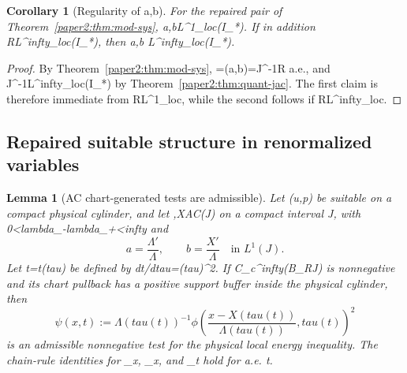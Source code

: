 \documentclass[11pt]{amsart}
\def\({}%
\def\){}%
\def\tau{tau}%
\def\lambda{lambda}%
\def\infty{infty}%
\theoremstyle{plain}
\newtheorem{lemma}[lemma]{Lemma}
\newtheorem{corollary}[corollary]{Corollary}
\theoremstyle{definition}
\theoremstyle{remark}
\begin{document}
\begin{corollary}[Regularity of \(a,b\)]
For the repaired pair of Theorem~\ref{paper2:thm:mod-sys}, \(a,b\in L^1_{\rm loc}(I_*)\).
If in addition \(\mathcal R\in L^\infty_{\rm loc}(I_*)\), then \(a,b\in
L^\infty_{\rm loc}(I_*)\).
\end{corollary}

\begin{proof}
By Theorem~\ref{paper2:thm:mod-sys}, \(\theta=(a,b)=J^{-1}\mathcal R\) a.e., and
\(J^{-1}\in L^\infty_{\rm loc}(I_*)\) by Theorem~\ref{paper2:thm:quant-jac}. The first claim is therefore
immediate from \(\mathcal R\in L^1_{\rm loc}\), while the second follows if \(\mathcal R\in L^\infty_{\rm loc}\).
\end{proof}

\subsection{Repaired suitable structure in renormalized variables}\label{paper2:sec:suitable}

\begin{lemma}[AC chart-generated tests are admissible]\label{paper2:lem:ac-chart-tests}
Let \((u,p)\) be suitable on a compact physical cylinder, and let
\(\Lambda,X\in AC(J)\) on a compact interval \(J\), with
\(0<\lambda_-\le \Lambda\le\lambda_+<\infty\) and
\[
a=\frac{\Lambda'}{\Lambda},\qquad b=\frac{X'}{\Lambda}
\quad\text{in }L^1(J).
\]
Let \(t=t(\tau)\) be defined by \(dt/d\tau=\Lambda(\tau)^2\).  If
\(\phi\in C_c^\infty(B_R\times J)\) is nonnegative and its chart pullback has a
positive support buffer inside the physical cylinder, then
\[
\psi(x,t):=\Lambda(\tau(t))^{-1}
\phi\!\left(\frac{x-X(\tau(t))}{\Lambda(\tau(t))},\tau(t)\right)^2
\]
is an admissible nonnegative test for the physical local energy inequality.
The chain-rule identities for \(\nabla_x\psi\), \(\Delta_x\psi\), and
\(\partial_t\psi\) hold for a.e. \(t\).
\end{lemma}
\end{document}
